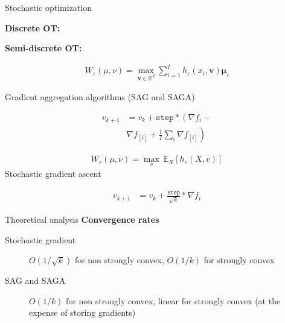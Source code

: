 \documentclass{beamer}
\begin{document}
\begin{frame}{Stochastic optimization}
    \begin{minipage}{.46\linewidth}
        \textbf{Discrete OT:}
    \end{minipage}
    \hfill
    \hfill
    \begin{minipage}{.46\linewidth}
        \textbf{Semi-discrete OT:} 
    \end{minipage}   


    \begin{minipage}{.46\linewidth}
        \begin{align*}
            W_\varepsilon(\mu, \nu) =\max_{\bm{v}\in \mathbb{R}^{J}}\sum_{i=1}^I \overline{h}_\varepsilon(x_i, \bm{v})\bm{\mu}_i
        \end{align*}

        Gradient aggregation algorithms (SAG and SAGA)

        {\footnotesize\begin{align*}
            v_{k+1} & = v_k + \texttt{step}* \left( \nabla f_i - \right.\\
            & \left. \nabla f_{[i]} + \frac{1}{I}\sum_i \nabla f_{[i]}\right)
        \end{align*}}
    \end{minipage}
    \hfill
    \vline
    \hfill
    \begin{minipage}{.46\linewidth}
        \begin{align*}
            W_\varepsilon(\mu, \nu) = \max_{v}\  \mathbb{E}_{X}[h_\varepsilon(X, v)]
        \end{align*}
        Stochastic gradient ascent

        {\footnotesize\begin{align*}
            v_{k+1} & = v_k + \frac{\texttt{step}}{\sqrt{k}}* \nabla f_i 
        \end{align*}}
    \end{minipage}
\end{frame}

\begin{frame}{Theoretical analysis}
    \textbf{Convergence rates}
    \begin{description}
        \item[Stochastic gradient] $O(1/\sqrt{k})$ for non strongly convex, $O(1/k)$ for strongly convex
        \item[SAG and SAGA] $O(1/k)$ for non strongly convex, linear for strongly convex (at the expense of storing gradients)
    \end{description}
\end{frame}
\end{document}
